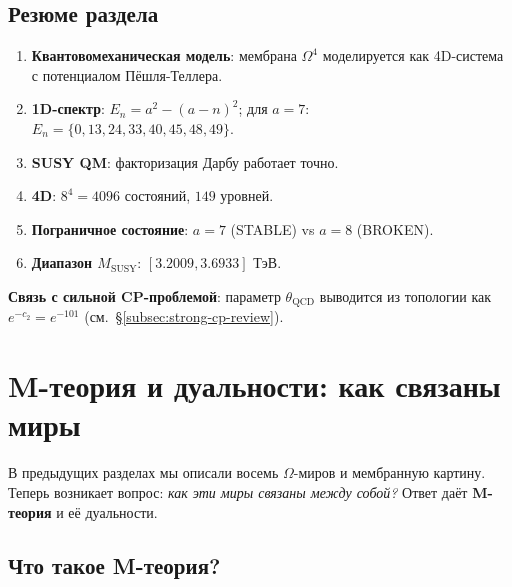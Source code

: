 \documentclass[11pt,a4paper]{article}
\newcommand{\Om}{\Omega^4}
\newcommand{\MSUSY}{M_{\text{SUSY}}}
\theoremstyle{definition}
\begin{document}
\subsection{Резюме раздела}

\begin{enumerate}
    \item \textbf{Квантовомеханическая модель}: мембрана $\Om$ 
          моделируется как 4D-система с потенциалом Пёшля-Теллера.
    \item \textbf{1D-спектр}: $E_n = a^2 - (a-n)^2$; 
          для $a = 7$: $E_n = \{0, 13, 24, 33, 40, 45, 48, 49\}$.
    \item \textbf{SUSY QM}: факторизация Дарбу работает точно.
    \item \textbf{4D}: $8^4 = 4096$ состояний, $149$ уровней.
    \item \textbf{Пограничное состояние}: $a = 7$ (STABLE) vs 
          $a = 8$ (BROKEN).
    \item \textbf{Диапазон $\MSUSY$}: $[3.2009, 3.6933]$ ТэВ.
\end{enumerate}

\medskip\noindent
\textbf{Связь с сильной CP-проблемой}: параметр $\theta_{\text{QCD}}$ 
выводится из топологии как $e^{-c_2} = e^{-101}$ 
(см.~\S\ref{subsec:strong-cp-review}).

\section{M-теория и дуальности: как связаны миры}
\label{sec:mtheory}

В предыдущих разделах мы описали восемь $\Omega$-миров и 
мембранную картину. Теперь возникает вопрос: \emph{как эти 
миры связаны между собой?} Ответ даёт \textbf{M-теория} 
и её дуальности.

\subsection{Что такое M-теория?}
\label{subsec:what-is-mtheory}
\end{document}
